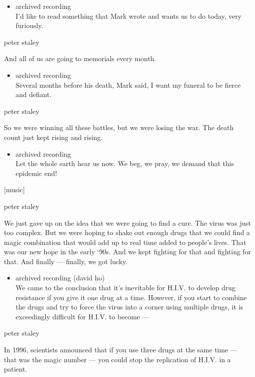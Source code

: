 \begin{itemize}
\tightlist
\item
  archived recording\\
  I'd like to read something that Mark wrote and wants us to do today,
  very furiously.
\end{itemize}

peter staley

And all of us are going to memorials every month.

\begin{itemize}
\tightlist
\item
  archived recording\\
  Several months before his death, Mark said, I want my funeral to be
  fierce and defiant.
\end{itemize}

peter staley

So we were winning all these battles, but we were losing the war. The
death count just kept rising and rising.

\begin{itemize}
\tightlist
\item
  archived recording\\
  Let the whole earth hear us now. We beg, we pray, we demand that this
  epidemic end!
\end{itemize}

{[}music{]}

peter staley

We just gave up on the idea that we were going to find a cure. The virus
was just too complex. But we were hoping to shake out enough drugs that
we could find a magic combination that would add up to real time added
to people's lives. That was our new hope in the early `90s. And we kept
fighting for that and fighting for that. And finally --- finally, we got
lucky.

\begin{itemize}
\tightlist
\item
  archived recording (david ho)\\
  We came to the conclusion that it's inevitable for H.I.V. to develop
  drug resistance if you give it one drug at a time. However, if you
  start to combine the drugs and try to force the virus into a corner
  using multiple drugs, it is exceedingly difficult for H.I.V. to become
  ---
\end{itemize}

peter staley

In 1996, scientists announced that if you use three drugs at the same
time --- that was the magic number --- you could stop the replication of
H.I.V. in a patient.

